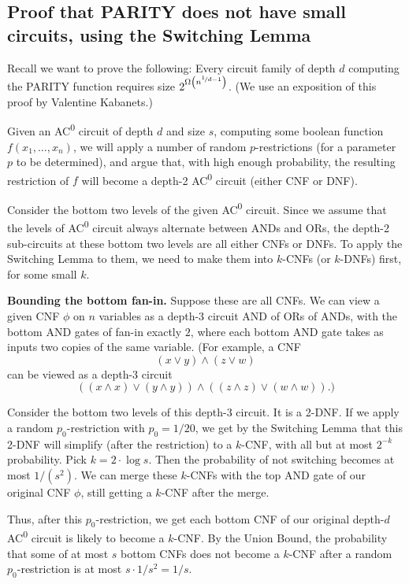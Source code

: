 \subsection{Proof that PARITY does not have small circuits, using the Switching Lemma}

Recall we want to prove the following: Every circuit family of depth $d$ computing the PARITY function requires size $2^{\Omega\left(n^{\nicefrac{1}{d-1}}\right)}$.
(We use an exposition of this proof by Valentine Kabanets.) 


Given an AC\textsuperscript{0} circuit of depth $d$ and size $s$, computing some boolean function $f(x_1, \dots, x_n)$, we will apply a number of random $p$-restrictions (for a parameter $p$ to be determined), and argue that, with high enough probability, the resulting restriction of $f$ will become a depth-2 AC\textsuperscript{0} circuit (either CNF or DNF).

Consider the bottom two levels of the given AC\textsuperscript{0} circuit. Since we assume that the levels of AC\textsuperscript{0} circuit always alternate between ANDs and ORs, the depth-2 sub-circuits at these bottom two levels are all either CNFs or DNFs. To apply the Switching Lemma to them, we need to make them into $k$-CNFs (or $k$-DNFs) first, for some small $k$.

\textbf{Bounding the bottom fan-in.} Suppose these are all CNFs. We can view a given CNF $\phi$ on $n$ variables as a depth-3 circuit AND of ORs of ANDs, with the bottom AND gates of fan-in exactly $2$, where each bottom AND gate takes as inputs two copies of the same variable. (For example, a CNF
\[
(x \vee y) \wedge (z \vee w)
\]
can be viewed as a depth-3 circuit
\[
((x \wedge x) \vee (y \wedge y)) \wedge ((z \wedge z) \vee (w \wedge w)).)
\]

Consider the bottom two levels of this depth-3 circuit. It is a 2-DNF. If we apply a random $p_0$-restriction with $p_0 = 1/20$, we get by the Switching Lemma that this 2-DNF will simplify (after the restriction) to a $k$-CNF, with all but at most $2^{-k}$ probability. Pick $k = 2 \cdot \log s$. Then the probability of not switching becomes at most $1/(s^2)$. We can merge these $k$-CNFs with the top AND gate of our original CNF $\phi$, still getting a $k$-CNF after the merge.

Thus, after this $p_0$-restriction, we get each bottom CNF of our original depth-$d$ AC\textsuperscript{0} circuit is likely to become a $k$-CNF. By the Union Bound, the probability that some of at most $s$ bottom CNFs does not become a $k$-CNF after a random $p_0$-restriction is at most $s \cdot 1/s^2 = 1/s$.






